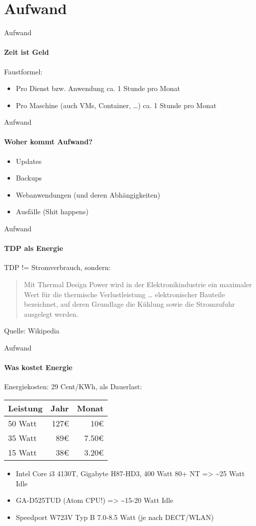\section{Aufwand}

\begin{frame}{Aufwand}
\framesubtitle{Zeit ist Geld}
Faustformel:
\begin{itemize}
\item Pro Dienst bzw. Anwendung ca. 1 Stunde pro Monat
\pause
\item Pro Maschine (auch VMs, Container, …) ca. 1 Stunde pro Monat
\end{itemize}
\end{frame}

\begin{frame}{Aufwand}
\framesubtitle{Woher kommt Aufwand?}
\begin{itemize}
\item Updates
\pause
\item Backups
\pause
\item Webanwendungen (und deren Abhängigkeiten)
\pause
\item Ausfälle (Shit happens)
\end{itemize}
\end{frame}

\begin{frame}{Aufwand}
\framesubtitle{TDP als Energie}
TDP != Stromverbrauch, sondern:\\
\pause
\begin{quote}
Mit Thermal Design Power wird in der Elektronikindustrie ein maximaler Wert für die thermische Verlustleistung … elektronischer Bauteile bezeichnet, auf deren Grundlage die Kühlung sowie die Stromzufuhr ausgelegt werden.
\end{quote}
\begin{small}
Quelle: Wikipedia
\end{small}
\end{frame}

\begin{frame}{Aufwand}
\framesubtitle{Was kostet Energie}
Energiekosten: 29 Cent/KWh, als Dauerlast:\\
\pause
\begin{tabular}{|l|r|r|}
\hline
\textbf{Leistung} & \textbf{Jahr} & \textbf{Monat} \\
\hline
50 Watt & 127€ &  10€ \\
\hline
35 Watt & 89€ & 7.50€ \\
\hline
15 Watt & 38€ & 3.20€ \\
\hline
\end{tabular}
\pause
\begin{itemize}
\item Intel Core i3 4130T, Gigabyte H87-HD3, 400 Watt 80+ NT => \textasciitilde{}25 Watt Idle
\pause
\item GA-D525TUD (Atom CPU!) => \textasciitilde{}15-20 Watt Idle
\pause
\item Speedport W723V Typ B 7.0-8.5 Watt (je nach DECT/WLAN)
\end{itemize}
\end{frame}

